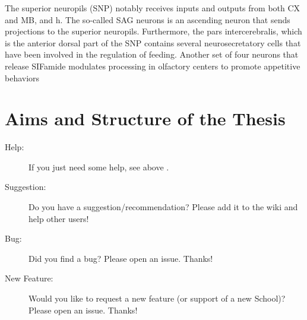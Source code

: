 The superior neuropils (SNP) notably receives inputs and outputs from both CX and MB, and h. The so-called SAG neurons is an ascending neuron that sends projections to the superior neuropils. Furthermore, the pars intercerebralis, which is the anterior dorsal part of the SNP contains several neurosecretatory cells that have been involved in the regulation of feeding. Another set of four neurons that release SIFamide modulates processing in olfactory centers to promote appetitive behaviors


\section{Aims and Structure of the Thesis}
\label{sec:aims}


\begin{description}
  \item[Help:] If you just need some help, see above .
  \item[Suggestion:] Do you have a suggestion/recommendation? Please add it to the wiki and help other users!
  \item[Bug:] Did you find a bug? Please open an issue. Thanks!
  \item[New Feature:] Would you like to request a new feature (or support of a new School)? Please open an issue. Thanks!

\end{description}